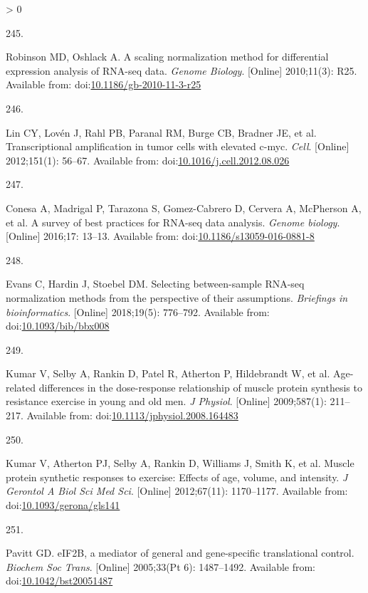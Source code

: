 \documentclass[twoside,10pt]{gihclass} %
\newlength{\cslhangindent}
\newlength{\csllabelwidth}
\newenvironment{CSLReferences}[3] %
 {%
  \setlength{\parindent}{0pt}
  \ifodd #1 \everypar{\setlength{\hangindent}{\cslhangindent}}\ignorespaces\fi
  \ifnum #2 > 0
  \setlength{\parskip}{#2\baselineskip}
  \fi
 }%
 {}
\newcommand{\CSLLeftMargin}[1]{\parbox[t]{\maxof{\widthof{#1}}{\csllabelwidth}}{#1}}
\newcommand{\CSLRightInline}[1]{\parbox[t]{\linewidth}{#1}}
\begin{document}
\begin{CSLReferences}{0}{0}
\leavevmode\hypertarget{ref-RN2414}{}%
\CSLLeftMargin{245. }
\CSLRightInline{Robinson MD, Oshlack A. A scaling normalization method for differential expression analysis of RNA-seq data. \emph{Genome Biology}. {[}Online{]} 2010;11(3): R25. Available from: doi:\href{https://doi.org/10.1186/gb-2010-11-3-r25}{10.1186/gb-2010-11-3-r25}}

\leavevmode\hypertarget{ref-RN2430}{}%
\CSLLeftMargin{246. }
\CSLRightInline{Lin CY, Lovén J, Rahl PB, Paranal RM, Burge CB, Bradner JE, et al. Transcriptional amplification in tumor cells with elevated c-myc. \emph{Cell}. {[}Online{]} 2012;151(1): 56--67. Available from: doi:\href{https://doi.org/10.1016/j.cell.2012.08.026}{10.1016/j.cell.2012.08.026}}

\leavevmode\hypertarget{ref-RN2426}{}%
\CSLLeftMargin{247. }
\CSLRightInline{Conesa A, Madrigal P, Tarazona S, Gomez-Cabrero D, Cervera A, McPherson A, et al. A survey of best practices for RNA-seq data analysis. \emph{Genome biology}. {[}Online{]} 2016;17: 13--13. Available from: doi:\href{https://doi.org/10.1186/s13059-016-0881-8}{10.1186/s13059-016-0881-8}}

\leavevmode\hypertarget{ref-RN2878}{}%
\CSLLeftMargin{248. }
\CSLRightInline{Evans C, Hardin J, Stoebel DM. Selecting between-sample RNA-seq normalization methods from the perspective of their assumptions. \emph{Briefings in bioinformatics}. {[}Online{]} 2018;19(5): 776--792. Available from: doi:\href{https://doi.org/10.1093/bib/bbx008}{10.1093/bib/bbx008}}

\leavevmode\hypertarget{ref-RN2720}{}%
\CSLLeftMargin{249. }
\CSLRightInline{Kumar V, Selby A, Rankin D, Patel R, Atherton P, Hildebrandt W, et al. Age-related differences in the dose-response relationship of muscle protein synthesis to resistance exercise in young and old men. \emph{J Physiol}. {[}Online{]} 2009;587(1): 211--217. Available from: doi:\href{https://doi.org/10.1113/jphysiol.2008.164483}{10.1113/jphysiol.2008.164483}}

\leavevmode\hypertarget{ref-RN2716}{}%
\CSLLeftMargin{250. }
\CSLRightInline{Kumar V, Atherton PJ, Selby A, Rankin D, Williams J, Smith K, et al. Muscle protein synthetic responses to exercise: Effects of age, volume, and intensity. \emph{J Gerontol A Biol Sci Med Sci}. {[}Online{]} 2012;67(11): 1170--1177. Available from: doi:\href{https://doi.org/10.1093/gerona/gls141}{10.1093/gerona/gls141}}

\leavevmode\hypertarget{ref-RN2853}{}%
\CSLLeftMargin{251. }
\CSLRightInline{Pavitt GD. eIF2B, a mediator of general and gene-specific translational control. \emph{Biochem Soc Trans}. {[}Online{]} 2005;33(Pt 6): 1487--1492. Available from: doi:\href{https://doi.org/10.1042/bst20051487}{10.1042/bst20051487}}


\end{CSLReferences}
\end{document}
